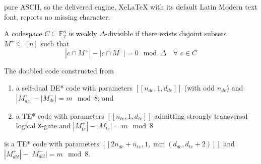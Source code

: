 \documentclass[10pt,a4paper]{amsart}
\newcommand{\X}{\texttt{X}}
\begin{document}
pure ASCII, so the delivered engine, XeLaTeX with its default Latin Modern text font, reports no missing character.
\begin{definition}\label{def:gen_delta_div}
    A codespace $C \subseteq \mathbb{F}^n_2$ is weakly $\Delta$-divisible if there exists disjoint subsets $M^\pm\subseteq [n]$ such that 
    \begin{equation}
        |c\cap M^+|-|c\cap M^-|=0 \mod{\Delta} \quad \forall\,\, c\in C 
        \end{equation}
\end{definition}

\begin{theorem}\label{thm:dbling_te}
    The doubled code constructed from 
    \begin{enumerate}
        \item a self-dual DE* code with parameters $[[n_{de},1,d_{de}]]$ (with odd $n_{de}$) and $|M_{de}^+|-|M_{de}^-|=m \mod{8}$; and
        \item a TE* code with parameters $[[n_{te},1,d_{te}]]$ admitting strongly transversal logical \X-gate and $|M_{te}^+|-|M_{te}^-|=m \mod{8}$
    \end{enumerate}  
    is a TE* code with parameters $[[2n_{de}+n_{te},1,\min(d_{de},d_{te}+2)]]$ and $|M_{dbl}^+|-|M_{dbl}^-|=m \mod{8}$.
\end{theorem}
\end{document}
